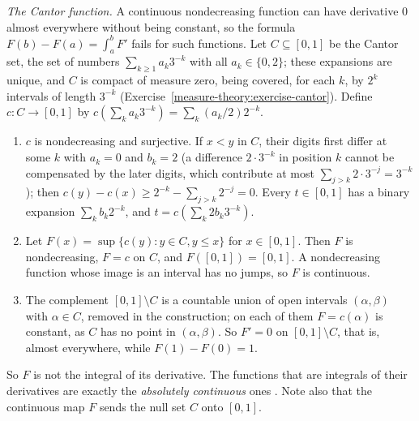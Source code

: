 \begin{counterexample}\label{lebesgue-differentiation:counterexample-cantor-function}
\emph{The Cantor function.} A continuous nondecreasing function can have derivative $0$ almost everywhere without being constant, so the formula
$F(b) - F(a) = \int_a^bF'$ fails for such functions. Let $C \subseteq [0, 1]$ be the Cantor set, the set of numbers $\sum_{k \geq 1}a_k3^{-k}$ with all
$a_k \in \{0, 2\}$; these expansions are unique, and $C$ is compact of measure zero, being covered, for each $k$, by $2^k$ intervals of length $3^{-k}$
(Exercise~\ref{measure-theory:exercise-cantor}). Define $c \colon C \to [0, 1]$ by $c(\sum_ka_k3^{-k}) = \sum_k(a_k/2)2^{-k}$.
\begin{enumerate}
\item $c$ is nondecreasing and surjective. If $x < y$ in $C$, their digits first differ at some $k$ with $a_k = 0$ and $b_k = 2$ (a difference $2 \cdot 3^{-k}$ in
position $k$ cannot be compensated by the later digits, which contribute at most $\sum_{j > k}2 \cdot 3^{-j} = 3^{-k}$); then $c(y) - c(x) \geq 2^{-k} - \sum_{j > k}2^{-j} = 0$.
Every $t \in [0, 1]$ has a binary expansion $\sum_kb_k2^{-k}$, and $t = c(\sum_k2b_k3^{-k})$.
\item Let $F(x) = \sup\{c(y) : y \in C, y \leq x\}$ for $x \in [0, 1]$. Then $F$ is nondecreasing, $F = c$ on $C$, and $F([0, 1]) = [0, 1]$. A nondecreasing function
whose image is an interval has no jumps, so $F$ is continuous.
\item The complement $[0, 1] \setminus C$ is a countable union of open intervals $(\alpha, \beta)$ with $\alpha \in C$, removed in the construction; on each of them
$F = c(\alpha)$ is constant, as $C$ has no point in $(\alpha, \beta)$. So $F' = 0$ on $[0, 1] \setminus C$, that is, almost everywhere, while $F(1) - F(0) = 1$.
\end{enumerate}
So $F$ is not the integral of its derivative. The functions that are integrals of their derivatives are exactly the \emph{absolutely continuous} ones
\cite[Chapter 7]{rudin-rca}. Note also that the continuous map $F$ sends the null set $C$ onto $[0, 1]$.
\end{counterexample}

